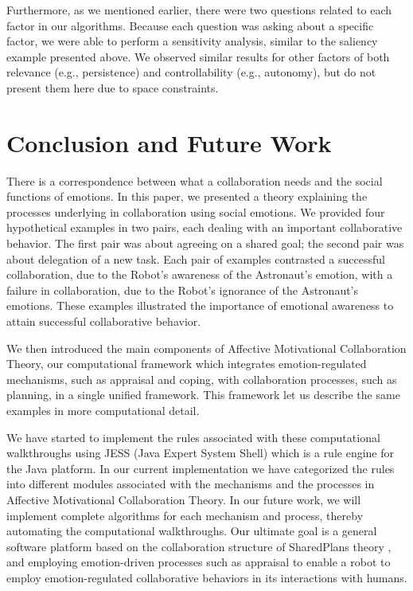Furthermore, as we mentioned earlier, there were two questions related to each
factor in our algorithms. Because each question was asking about a specific
factor, we were able to perform a sensitivity analysis, similar to the saliency
example presented above. We observed similar results for other factors of both
relevance (e.g., persistence) and controllability (e.g., autonomy), but do not
present them here due to space constraints.

\section{Conclusion and Future Work}

There is a correspondence between what a collaboration needs and the social
functions of emotions. In this paper, we presented a theory explaining the
processes underlying in collaboration using social emotions. We provided four
hypothetical examples in two pairs, each dealing with an important collaborative
behavior. The first pair was about agreeing on a shared goal; the second pair
was about delegation of a new task. Each pair of examples contrasted a
successful collaboration, due to the Robot's awareness of the Astronaut's
emotion, with a failure in collaboration, due to the Robot's ignorance of the
Astronaut's emotions. These examples illustrated the importance of
emotional awareness to attain successful collaborative behavior.

We then introduced the main components of Affective Motivational Collaboration
Theory, our computational framework which integrates emotion-regulated
mechanisms, such as appraisal and coping, with collaboration processes, such as
planning, in a single unified framework. This framework let us describe the same
examples in more computational detail.

We have started to implement the rules associated with these computational
walkthroughs using JESS (Java Expert System Shell) which is a rule engine for
the Java platform. In our current implementation we have categorized the rules
into different modules associated with the mechanisms and the processes in
Affective Motivational Collaboration Theory. In our future work, we will
implement complete algorithms for each mechanism and process, thereby automating
the computational walkthroughs. Our ultimate goal is a general software platform
based on the collaboration structure of SharedPlans theory
\cite{grosz:discourse-structure}, and employing emotion-driven processes such as
appraisal \cite{marsella:ema-process-model} to enable a robot to employ
emotion-regulated collaborative behaviors in its interactions with humans.

